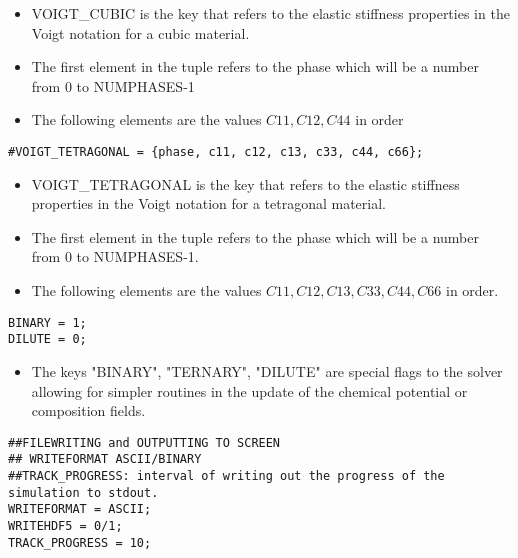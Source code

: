 \documentclass[a4paper,10pt]{article}
\begin{document}
\begin{itemize}
 \item VOIGT\_CUBIC is the key that refers to the elastic stiffness properties in the Voigt notation for a cubic material. 
 \item The first element in the tuple refers to the phase which will be a number from 0 to NUMPHASES-1
 \item The following elements are the values $C11,C12,C44$ in order
\end{itemize}

\begin{lstlisting}
#VOIGT_TETRAGONAL = {phase, c11, c12, c13, c33, c44, c66};
\end{lstlisting}

\begin{itemize}
 \item VOIGT\_TETRAGONAL is the key that refers to the elastic stiffness properties in the Voigt notation for a tetragonal material. 
 \item The first element in the tuple refers to the phase which will be a number from 0 to NUMPHASES-1.
 \item The following elements are the values $C11,C12,C13,C33,C44,C66$ in order.
\end{itemize}

\begin{lstlisting}
BINARY = 1;
DILUTE = 0;
\end{lstlisting}

\begin{itemize}
 \item The keys "BINARY", "TERNARY", "DILUTE" are special flags to the solver allowing for simpler routines in the update of the chemical potential or composition fields.
\end{itemize}

\begin{lstlisting}
##FILEWRITING and OUTPUTTING TO SCREEN
## WRITEFORMAT ASCII/BINARY
##TRACK_PROGRESS: interval of writing out the progress of the simulation to stdout. 
WRITEFORMAT = ASCII;
WRITEHDF5 = 0/1;
TRACK_PROGRESS = 10;
\end{lstlisting}
\end{document}
